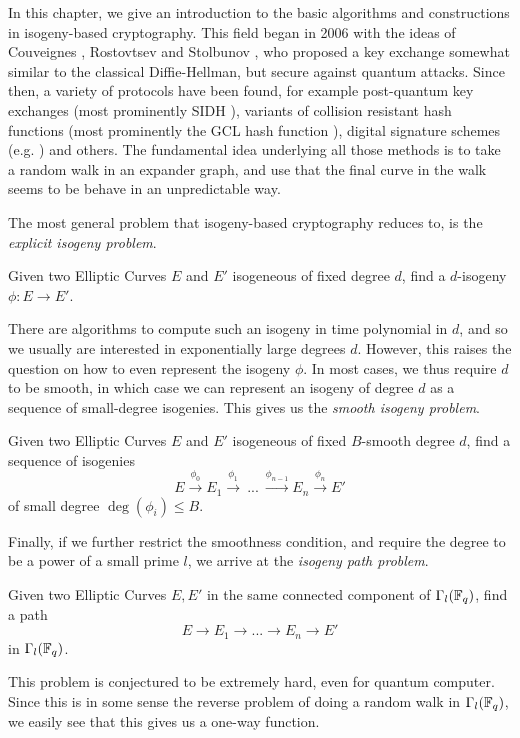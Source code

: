 In this chapter, we give an introduction to the basic algorithms and constructions in isogeny-based cryptography.
This field began in 2006 with the ideas of Couveignes \cite{old_isogeny_crypto1}, Rostovtsev and Stolbunov \cite{old_isogeny_crypto2, old_isogeny_crypto3}, who proposed a key exchange somewhat similar to the classical Diffie-Hellman, but secure against quantum attacks.
Since then, a variety of protocols have been found, for example post-quantum key exchanges (most prominently SIDH \cite{sidh}), variants of collision resistant hash functions (most prominently the GCL hash function \cite{supersingular_hash_function}), digital signature schemes (e.g. \cite{digital_signature}) and others. 
The fundamental idea underlying all those methods is to take a random walk in an expander graph, and use that the final curve in the walk seems to be behave in an unpredictable way.

The most general problem that isogeny-based cryptography reduces to, is the \emph{explicit isogeny problem}.
\begin{problem}
    Given two Elliptic Curves $E$ and $E'$ isogeneous of fixed degree $d$, find a $d$-isogeny $\phi: E \to E'$.
\end{problem}
There are algorithms to compute such an isogeny in time polynomial in $d$, and so we usually are interested in exponentially large degrees $d$.
However, this raises the question on how to even represent the isogeny $\phi$.
In most cases, we thus require $d$ to be smooth, in which case we can represent an isogeny of degree $d$ as a sequence of small-degree isogenies.
This gives us the \emph{smooth isogeny problem}.
\begin{problem}
    Given two Elliptic Curves $E$ and $E'$ isogeneous of fixed $B$-smooth degree $d$, find a sequence of isogenies
    \begin{equation*}
        E \overset{\phi_0}{\longrightarrow} E_1 \overset{\phi_1}{\longrightarrow} \ ... \ \overset{\phi_{n - 1}}{\longrightarrow} E_n \overset{\phi_n}{\longrightarrow} E'
    \end{equation*}
    of small degree $\deg(\phi_i) \leq B$.
\end{problem}
Finally, if we further restrict the smoothness condition, and require the degree to be a power of a small prime $l$, we arrive at the \emph{isogeny path problem}.
\begin{problem}
    Given two Elliptic Curves $E, E'$ in the same connected component of $\Gamma_l(\mathbb{F}_q)$, find a path
    \begin{equation*}
        E \to E_1 \to ... \to E_n \to E'
    \end{equation*}
    in $\Gamma_l(\mathbb{F}_q)$.
\end{problem}
This problem is conjectured to be extremely hard, even for quantum computer.
Since this is in some sense the reverse problem of doing a random walk in $\Gamma_l(\mathbb{F}_q)$, we easily see that this gives us a one-way function.

